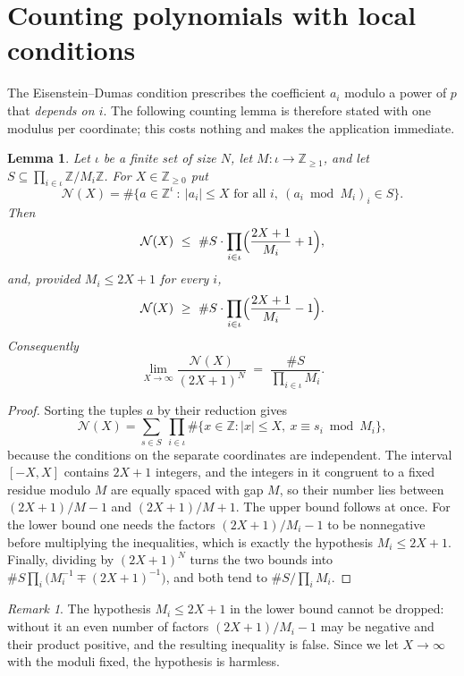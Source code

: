 \documentclass[11pt,reqno]{amsart}
\theoremstyle{plain}
\newtheorem{lemma}[theorem]{Lemma}
\theoremstyle{definition}
\theoremstyle{remark}
\newtheorem{remark}[theorem]{Remark}
\newcommand{\Z}{\mathbb{Z}}
\begin{document}
\section{Counting polynomials with local conditions}\label{sec:counting}

The Eisenstein--Dumas condition prescribes the coefficient $a_i$ modulo a power of $p$ that
\emph{depends on $i$}. The following counting lemma is therefore stated with one modulus per
coordinate; this costs nothing and makes the application immediate.

\begin{lemma}\label{lem:box}
Let $\iota$ be a finite set of size $N$, let $M:\iota\to\Z_{\ge1}$, and let
$S\subseteq\prod_{i\in\iota}\Z/M_i\Z$. For $X\in\Z_{\ge 0}$ put
\[
  \mathcal N(X)=\#\bigl\{a\in\Z^{\iota}\ :\ |a_i|\le X \text{ for all } i,\ (a_i \bmod M_i)_{i}\in S\bigr\}.
\]
Then
\[
  \mathcal N(X)\ \le\ \#S\cdot\prod_{i\in\iota}\Bigl(\frac{2X+1}{M_i}+1\Bigr),
\]
and, provided $M_i\le 2X+1$ for every $i$,
\[
  \mathcal N(X)\ \ge\ \#S\cdot\prod_{i\in\iota}\Bigl(\frac{2X+1}{M_i}-1\Bigr).
\]
Consequently
\[
  \lim_{X\to\infty}\frac{\mathcal N(X)}{(2X+1)^N}\;=\;\frac{\#S}{\prod_{i\in\iota}M_i}.
\]
\end{lemma}

\begin{proof}
Sorting the tuples $a$ by their reduction gives
\[
  \mathcal N(X)=\sum_{s\in S}\ \prod_{i\in\iota}\#\{x\in\Z: |x|\le X,\ x\equiv s_i \bmod M_i\},
\]
because the conditions on the separate coordinates are independent. The interval $[-X,X]$ contains
$2X+1$ integers, and the integers in it congruent to a fixed residue modulo $M$ are equally spaced
with gap $M$, so their number lies between $(2X+1)/M-1$ and $(2X+1)/M+1$. The upper bound follows
at once. For the lower bound one needs the factors $(2X+1)/M_i-1$ to be nonnegative before
multiplying the inequalities, which is exactly the hypothesis $M_i\le 2X+1$. Finally, dividing by
$(2X+1)^N$ turns the two bounds into
$\#S\prod_i\bigl(M_i^{-1}\mp(2X+1)^{-1}\bigr)$, and both tend to $\#S/\prod_iM_i$.
\end{proof}

\begin{remark}
The hypothesis $M_i\le 2X+1$ in the lower bound cannot be dropped: without it an even number of
factors $(2X+1)/M_i-1$ may be negative and their product positive, and the resulting inequality is
false. Since we let $X\to\infty$ with the moduli fixed, the hypothesis is harmless.
\end{remark}
\end{document}
